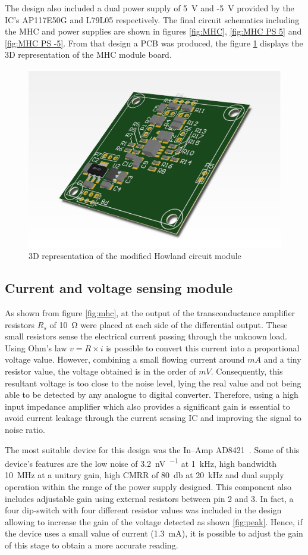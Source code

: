 The design also included a dual power supply of \SI{5}{\volt} and -\SI{5}{\volt} provided by the IC's AP117E50G and L79L05 respectively. The final circuit schematics including the MHC and power supplies are shown in figures \ref{fig:MHC}, \ref{fig:MHC PS 5} and \ref{fig:MHC PS -5}. From that design a PCB was produced, the figure \ref{fig:3D MHC} displays the 3D representation of the MHC module board. 

\begin{figure}[!htpb]
	\centering
	\includegraphics[width=7.5 cm,keepaspectratio]{figure_MHC}
	\caption{3D representation of the modified Howland circuit module}
	\label{fig:3D MHC}
\end{figure}

\subsection{Current and voltage sensing module}
\label{section V&I sense}
As shown from figure \ref{fig:mhc}, at the output of the transconductance amplifier resistors $R_s$ of \SI{10}{\ohm} were placed at each side of the differential output. These small resistors sense the electrical current passing through the unknown load. Using Ohm's law $v=R \times i$ is possible to convert this current into a proportional voltage value. However, combining a small flowing current around $mA$ and a tiny resistor value, the voltage obtained is in the order of $mV$. Consequently, this resultant voltage is too close to the noise level, lying the real value and not being able to be detected by any analogue to digital converter. Therefore, using a high input impedance amplifier which also provides a significant gain is essential to avoid current leakage through the current sensing IC and improving the signal to noise ratio.  

The most suitable device for this design was the In–Amp AD8421~\cite{ad:AD8421}. Some of this device's features are the low noise of \SI{3.2}{\nano\volt\per{}} at \SI{1}{\kHz}, high bandwidth \SI{10}{\mega\hertz} at a unitary gain, high CMRR of \SI{80}{\decibel} at \SI{20}{\kHz} and dual supply operation within the range of the power supply designed. This component also includes adjustable gain using external resistors between pin 2 and 3. In fact, a four dip-switch with four different resistor values was included in the design allowing to increase the gain of the voltage detected as shown \ref{fig:peak}. Hence, if the device uses a small value of current (\SI{1.3}{\mA}), it is possible to adjust the gain of this stage to obtain a more accurate reading.

